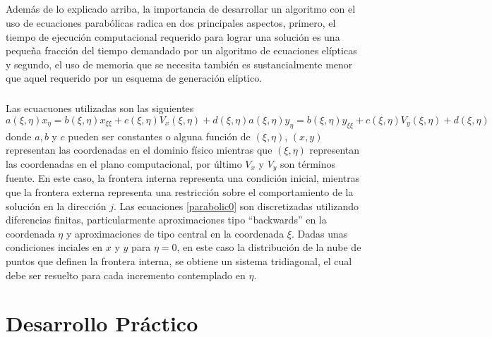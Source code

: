 \documentclass[letterpaper, openright, 12pt]{book}
\begin{document}
		\paragraph*{}
			Además de lo explicado arriba, la importancia de desarrollar un algoritmo con el uso de ecuaciones parabólicas radica en dos principales aspectos, primero, el tiempo de ejecución computacional requerido para lograr una solución es una pequeña fracción del tiempo demandado por un algoritmo de ecuaciones elípticas y segundo, el uso de memoria que se necesita también es sustancialmente menor que aquel requerido por un esquema de generación elíptico.
		
		\paragraph*{}
			Las ecuacuones utilizadas son las siguientes
			\begin{subequations}
				\begin{equation}
					a(\xi, \eta) x_\eta = b(\xi, \eta)x_{\xi\xi} + c(\xi, \eta)V_x(\xi, \eta) + d(\xi, \eta)
				\end{equation}
				\begin{equation}
					a(\xi, \eta) y_\eta = b(\xi, \eta)y_{\xi\xi} + c(\xi, \eta)V_y(\xi, \eta) + d(\xi, \eta)
				\end{equation}
				\label{parabolic0}
			\end{subequations}
			donde $a, b$ y $c$ pueden ser constantes o alguna función de $(\xi,\eta)$, $(x, y)$ representan las coordenadas en el dominio físico mientras que $(\xi, \eta)$ representan las coordenadas en el plano computacional, por último $V_x$ y $V_y$ son términos fuente. En este caso, la frontera interna representa una condición inicial, mientras que la frontera externa representa una restricción sobre el comportamiento de la solución en la dirección $j$. Las ecuaciones \ref{parabolic0} son discretizadas utilizando diferencias finitas, particularmente aproximaciones tipo ``backwards'' en la coordenada $\eta$ y aproximaciones de tipo central en la coordenada $\xi$. Dadas unas condiciones inciales en $x$ y $y$ para $\eta = 0$, en este caso la distribución de la nube de puntos que definen la frontera interna, se obtiene un sistema tridiagonal, el cual debe ser resuelto para cada incremento contemplado en $\eta$.
	
\chapter{Desarrollo Práctico}
\end{document}
